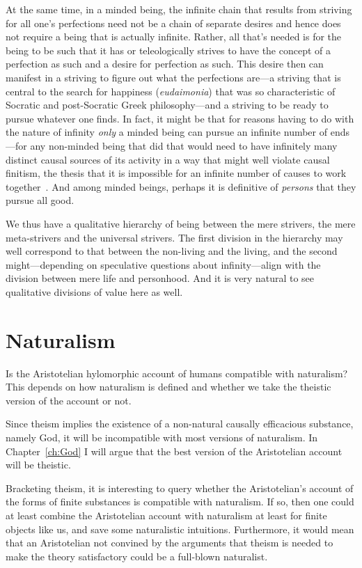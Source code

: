 At the same time, in a minded being, the infinite chain that results from striving for all one's perfections need not be a chain of separate desires
and hence does not require a being that is actually infinite. Rather, all that's needed is for the being to be such that it has or teleologically strives
to have the concept of a perfection as such and a desire for perfection as such. This desire then can manifest in a striving to figure out what the perfections are---a striving that is central to
the search for happiness (\textit{eudaimonia}) that was so characteristic of Socratic and post-Socratic Greek philosophy---and a striving to be ready
to pursue whatever one finds. In fact, it might be that for reasons having to do with the nature of infinity \textit{only} a minded being can pursue
an infinite number of ends---for any non-minded being that did that would need to have infinitely many distinct causal sources of its activity in
a way that might well violate causal finitism, the thesis that it is impossible for an infinite number of causes to work together~\parencite{KoonsKalaam,PrussInfinity}. And among minded beings, perhaps it is definitive of \textit{persons} that they pursue all good.

We thus have a qualitative hierarchy of being between the mere strivers, the mere meta-strivers and the universal strivers. The first division in
the hierarchy may well correspond to that between the non-living and the living, and the second might---depending on speculative questions about
infinity---align with the division between mere life and personhood. And it is very natural to see qualitative divisions of value here as well.



\section{Naturalism}
Is the Aristotelian hylomorphic account of humans compatible with naturalism? This depends on how naturalism
is defined and whether we take the theistic version of the account or not.

Since theism implies the existence of a non-natural causally efficacious substance, namely God, it will be incompatible
with most versions of naturalism. In Chapter~\ref{ch:God} I will argue that the best version of the Aristotelian account
will be theistic.

Bracketing theism, it is interesting to query whether the Aristotelian's account of the forms of finite
substances is compatible with naturalism. If so, then one could at least combine the Aristotelian account with 
naturalism at least for finite objects like us, and save some naturalistic intuitions. Furthermore, it would mean
that an Aristotelian not convined by the arguments that theism is needed to make the theory satisfactory could
be a full-blown naturalist.

